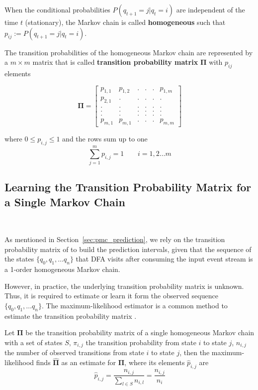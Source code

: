 \par When the conditional probabilities $P(q_{t+1}=j|q_{t}=i)$ are independent of the time $t$ (stationary), the Markov chain is called \textbf{homogeneous} such that $p_{ij}:=P(q_{t+1}=j|q_{t}=i)$.

The transition probabilities of the homogeneous Markov chain are represented by a $m \times m$ matrix that is called \textbf{transition probability matrix} $\boldsymbol{\Pi}$ with $p_{ij}$ elements


\begin{equation}
\label{eq:matrix_example}
\boldsymbol{\Pi} = 
\begin{bmatrix} 
p_{1,1}	   &p_{1,2}  &. 		&. 		& . &  	p_{1,m} \\
p_{2,1}		   &.  & .		& .	    & .	& . \\
. 		   &.  & .		& .	    & .	& . \\
.		   &.  & .		& .		& .	& . \\
.		   &.  & .		& .		& .	& .\\
p_{m,1}	   & p_{m,1}	&.		& .	& .	&p_{m,m}
\end{bmatrix}
\end{equation}

where $0 \leq p_{i,j}\leq 1 $ and the rows sum up to one 
\begin{equation}
\sum_{j=1}^{m} p_{i,j}= 1\ \ \ \ \ \ \ \ \ i=1,2 \ldots m
\end{equation}

\subsection{Learning the Transition Probability Matrix for a Single Markov Chain}
 \
\par As mentioned in Section~\ref{sec:pmc_prediction}, we rely on the transition probability matrix of \pmcmr to build the prediction intervals, given that the sequence of the states $\{q_0, q_1, \ldots q_n\}$ that DFA visits after consuming the input event stream is a 1-order homogeneous Markov chain.


\par However, in practice, the underlying transition probability matrix is unknown. Thus, it is required to estimate or learn it form the observed sequence $\{q_0, q_1, \ldots q_n\}$. The maximum-likelihood estimator is a common method to estimate the transition probability matrix \cite{anderson1957statistical}.


\begin{definition}
	Let $\boldsymbol{\Pi}$ be the transition probability matrix of a single homogeneous Markov chain with a set of states $S$, 
	$\pi_{i,j}$ the transition probability from state $i$ to state $j$,
	$n_{i,j}$ the number of observed transitions from state $i$ to state $j$,
	then the maximum-likelihood finds $\boldsymbol{\hat{\Pi}}$ as an estimate for $\boldsymbol{\Pi}$, where its elements $\hat{p}_{i,j}$ are
	\begin{equation}
	\label{eq:pi_estim}
	\hat{p}_{i,j}=\frac{n_{i,j}}{\sum_{l \in S} n_{i,l}}=\frac{n_{i,j}}{n_{i}}
	\end{equation}
	
\end{definition} 


